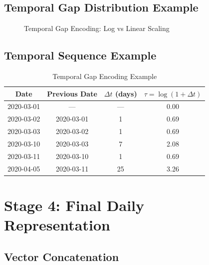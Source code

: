 \documentclass[12pt]{article}
\begin{document}
\subsection{Temporal Gap Distribution Example}

\begin{figure}[H]
\centering
{}
\caption{Temporal Gap Encoding: Log vs Linear Scaling}
\label{fig:temporal_gap}
\end{figure}

\subsection{Temporal Sequence Example}

\begin{table}[H]
\centering
\begin{tabular}{cccc}
\toprule
Date & Previous Date & $\Delta t$ (days) & $\tau = \log(1+\Delta t)$ \\
\midrule
2020-03-01 & --- & --- & 0.00 \\
2020-03-02 & 2020-03-01 & 1 & 0.69 \\
2020-03-03 & 2020-03-02 & 1 & 0.69 \\
2020-03-10 & 2020-03-03 & 7 & 2.08 \\
2020-03-11 & 2020-03-10 & 1 & 0.69 \\
2020-04-05 & 2020-03-11 & 25 & 3.26 \\
\bottomrule
\end{tabular}
\caption{Temporal Gap Encoding Example}
\end{table}

\newpage

\section{Stage 4: Final Daily Representation}

\subsection{Vector Concatenation}
\end{document}
